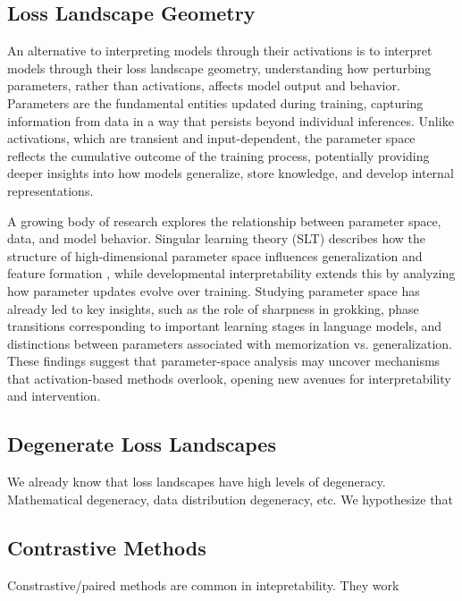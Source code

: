 \documentclass{article}
\theoremstyle{plain}
\theoremstyle{definition}
\theoremstyle{remark}
\begin{document}
\subsection{Loss Landscape Geometry}

An alternative to interpreting models through their activations is to interpret models through their loss landscape geometry, understanding how perturbing parameters, rather than activations, affects model output and behavior. Parameters are the fundamental entities updated during training, capturing information from data in a way that persists beyond individual inferences. Unlike activations, which are transient and input-dependent, the parameter space reflects the cumulative outcome of the training process, potentially providing deeper insights into how models generalize, store knowledge, and develop internal representations.

A growing body of research explores the relationship between parameter space, data, and model behavior. Singular learning theory (SLT) describes how the structure of high-dimensional parameter space influences generalization and feature formation \cite{watanabe2007almost,watanabe2000algebraic,watanabe2005algebraic,wei2022deep}, while developmental interpretability extends this by analyzing how parameter updates evolve over training\cite{sharkey2025open}. Studying parameter space has already led to key insights, such as the role of sharpness in grokking\cite{davies2023unifying}, phase transitions corresponding to important learning stages in language models\cite{wang2024loss,hoogland2024developmental}, and distinctions between parameters associated with memorization vs. generalization\cite{bushnaq2024using}. These findings suggest that parameter-space analysis may uncover mechanisms that activation-based methods overlook, opening new avenues for interpretability and intervention.

\subsection{Degenerate Loss Landscapes}

We already know that loss landscapes have high levels of degeneracy. Mathematical degeneracy, data distribution degeneracy, etc. We hypothesize that 

\subsection{Contrastive Methods}
Constrastive/paired methods are common in intepretability. They work
\end{document}
